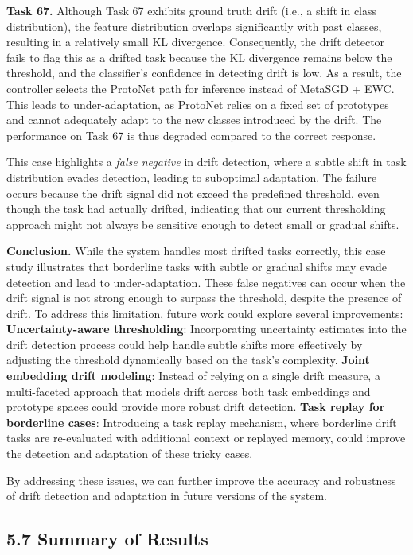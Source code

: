\documentclass[conference]{IEEEtran}
\begin{document}
\textbf{Task 67.}  
Although Task 67 exhibits ground truth drift (i.e., a shift in class distribution), the feature distribution overlaps significantly with past classes, resulting in a relatively small KL divergence. Consequently, the drift detector fails to flag this as a drifted task because the KL divergence remains below the threshold, and the classifier’s confidence in detecting drift is low. As a result, the controller selects the ProtoNet path for inference instead of MetaSGD + EWC. This leads to under-adaptation, as ProtoNet relies on a fixed set of prototypes and cannot adequately adapt to the new classes introduced by the drift. The performance on Task 67 is thus degraded compared to the correct response.

This case highlights a \textit{false negative} in drift detection, where a subtle shift in task distribution evades detection, leading to suboptimal adaptation. The failure occurs because the drift signal did not exceed the predefined threshold, even though the task had actually drifted, indicating that our current thresholding approach might not always be sensitive enough to detect small or gradual shifts.

\textbf{Conclusion.}  
While the system handles most drifted tasks correctly, this case study illustrates that borderline tasks with subtle or gradual shifts may evade detection and lead to under-adaptation. These false negatives can occur when the drift signal is not strong enough to surpass the threshold, despite the presence of drift. To address this limitation, future work could explore several improvements:
 \textbf{Uncertainty-aware thresholding}: Incorporating uncertainty estimates into the drift detection process could help handle subtle shifts more effectively by adjusting the threshold dynamically based on the task's complexity.
 \textbf{Joint embedding drift modeling}: Instead of relying on a single drift measure, a multi-faceted approach that models drift across both task embeddings and prototype spaces could provide more robust drift detection.
 \textbf{Task replay for borderline cases}: Introducing a task replay mechanism, where borderline drift tasks are re-evaluated with additional context or replayed memory, could improve the detection and adaptation of these tricky cases.

By addressing these issues, we can further improve the accuracy and robustness of drift detection and adaptation in future versions of the system.


\subsection{5.7 Summary of Results}
\end{document}
